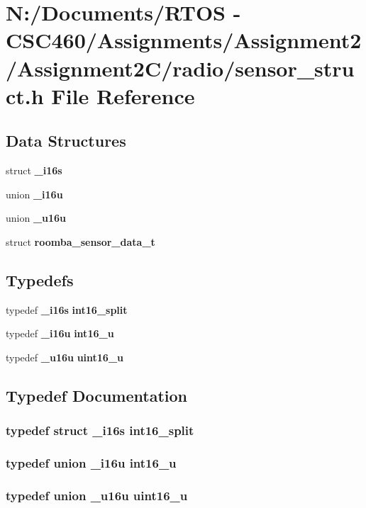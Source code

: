 \section{N:/Documents/RTOS - CSC460/Assignments/Assignment2/Assignment2C/radio/sensor\_\-struct.h File Reference}
\label{sensor__struct_8h}
\subsection*{Data Structures}
\begin{CompactItemize}
\item 
struct {\bf \_\-i16s}
\item 
union {\bf \_\-i16u}
\item 
union {\bf \_\-u16u}
\item 
struct {\bf roomba\_\-sensor\_\-data\_\-t}
\end{CompactItemize}
\subsection*{Typedefs}
\begin{CompactItemize}
\item 
typedef {\bf \_\-i16s} {\bf int16\_\-split}
\item 
typedef {\bf \_\-i16u} {\bf int16\_\-u}
\item 
typedef {\bf \_\-u16u} {\bf uint16\_\-u}
\end{CompactItemize}


\subsection{Typedef Documentation}
\subsubsection{\setlength{\rightskip}{0pt plus 5cm}typedef struct {\bf \_\-i16s}  {\bf int16\_\-split}}\label{sensor__struct_8h_0f009882af3e11df1e166274ade9c53b}


\subsubsection{\setlength{\rightskip}{0pt plus 5cm}typedef union {\bf \_\-i16u}  {\bf int16\_\-u}}\label{sensor__struct_8h_8fa793bed75d0c13cc3890fe65950723}


\subsubsection{\setlength{\rightskip}{0pt plus 5cm}typedef union {\bf \_\-u16u}  {\bf uint16\_\-u}}\label{sensor__struct_8h_e1a42e228b7051ddfec444228d786785}


